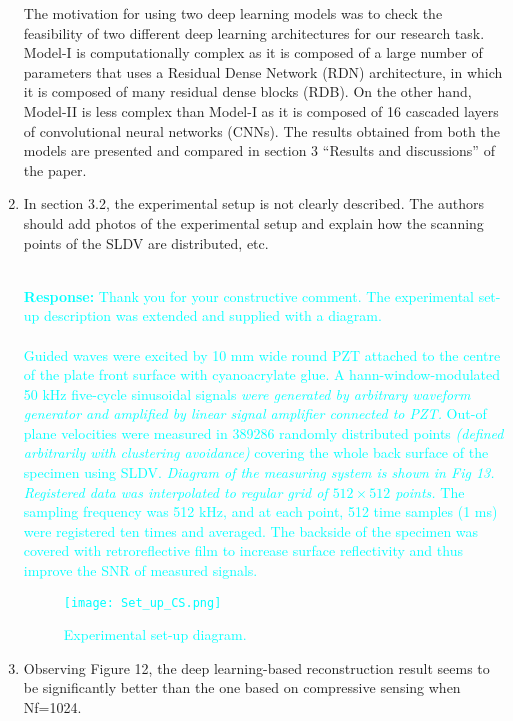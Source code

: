 \documentclass[11pt,a2paper]{report}
\begin{document}
\begin{enumerate}
{			The motivation for using two deep learning models was to check the feasibility of two different deep learning architectures for our research task. 
			Model-I is computationally complex as it is composed of a large number of parameters that uses a Residual Dense Network (RDN) architecture, in which it is composed of many residual dense blocks (RDB). 
			On the other hand, Model-II is less complex than Model-I as it is composed of 16 cascaded layers of convolutional neural networks (CNNs). 
			The results obtained from both the models are presented and compared in section 3 \enquote{Results and discussions} of the paper. 
		}
		\item In section 3.2, the experimental setup is not clearly described. 
		The authors should add photos of the experimental setup and explain how the scanning points of the SLDV are distributed, etc.
		\\ \\ 
		\textcolor{Cyan}
		{
			\textbf{Response:}
			Thank you for your constructive comment.
			The experimental set-up description was extended and supplied with a diagram. \\ \\
			Guided waves were excited by 10 mm wide round PZT attached to the centre of the plate front surface with cyanoacrylate glue. 
			A hann-window-modulated 50 kHz five-cycle sinusoidal signals \emph{were generated by arbitrary waveform generator and amplified by linear signal amplifier connected to PZT.} 
			Out-of plane velocities were measured in 389286 randomly distributed points \emph{(defined arbitrarily with clustering avoidance)} covering the whole back surface of the specimen using SLDV. 
			\emph{
				Diagram of the measuring system is shown in Fig 13. 
				Registered data was interpolated to regular grid of \(512\times512\) points.}
			The sampling frequency was 512 kHz, and at each point, 512 time samples (1 ms) were registered ten times and averaged. 
			The backside of the specimen was covered with retroreflective film to increase surface reflectivity and thus improve the SNR of measured signals.
			\setcounter{figure}{12}
			\begin{figure} [!h]
				\centering
				\texttt{[image: Set\_up\_CS.png]}
				\caption{\textcolor{Cyan}{Experimental set-up diagram.}}
				\label{fig:exp_setup}
			\end{figure}
		}
		\item  Observing Figure 12, the deep learning-based reconstruction result seems to be significantly better than the one based on compressive sensing when Nf=1024. 

\end{enumerate}
\end{document}
